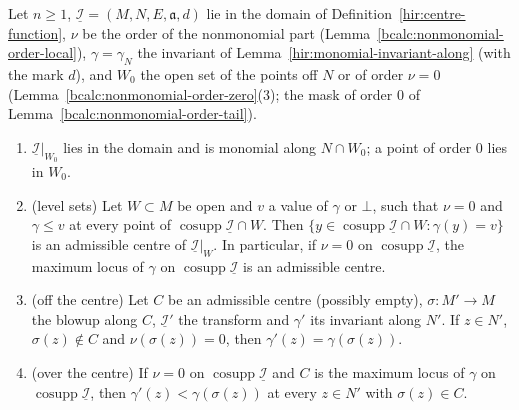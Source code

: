 \begin{lemma}
\label{bcalc:nonmonomial-order-monomial}
\mixedleanok
Let \(n\ge1\), \(\underline{\mathcal I}=(M,N,E,\mathfrak a,d)\) lie in the domain of Definition~\ref{hir:centre-function}, \(\nu\) be the order of the nonmonomial part
(Lemma~\ref{bcalc:nonmonomial-order-local}), \(\gamma=\gamma_N\) the invariant of Lemma~\ref{hir:monomial-invariant-along} (with the mark \(d\)), and \(W_0\) the open set of the
points off \(N\) or of order \(\nu=0\) (Lemma~\ref{bcalc:nonmonomial-order-zero}(3); the mask of order \(0\) of Lemma~\ref{bcalc:nonmonomial-order-tail}).
\begin{enumerate}
\item \(\underline{\mathcal I}|_{W_0}\) lies in the domain and is monomial along \(N\cap W_0\); a point of order \(0\) lies in \(W_0\).
\item (level sets) Let \(W\subset M\) be open and \(v\) a value of \(\gamma\) or \(\bot\), such that \(\nu=0\) and \(\gamma\le v\) at every point of
\(\operatorname{cosupp}\underline{\mathcal I}\cap W\). Then \(\{y\in\operatorname{cosupp}\underline{\mathcal I}\cap W:\gamma(y)=v\}\) is an admissible centre of \(\underline{\mathcal I}|_W\).
In particular, if \(\nu=0\) on \(\operatorname{cosupp}\underline{\mathcal I}\), the maximum locus of \(\gamma\) on \(\operatorname{cosupp}\underline{\mathcal I}\) is an admissible centre.
\item (off the centre) Let \(C\) be an admissible centre (possibly empty), \(\sigma\colon M'\to M\) the blowup along \(C\), \(\underline{\mathcal I}'\) the transform and
\(\gamma'\) its invariant along \(N'\). If \(z\in N'\), \(\sigma(z)\notin C\) and \(\nu(\sigma(z))=0\), then \(\gamma'(z)=\gamma(\sigma(z))\).
\item (over the centre) If \(\nu=0\) on \(\operatorname{cosupp}\underline{\mathcal I}\) and \(C\) is the maximum locus of \(\gamma\) on \(\operatorname{cosupp}\underline{\mathcal I}\), then
\(\gamma'(z)<\gamma(\sigma(z))\) at every \(z\in N'\) with \(\sigma(z)\in C\).
\end{enumerate}
\end{lemma}
